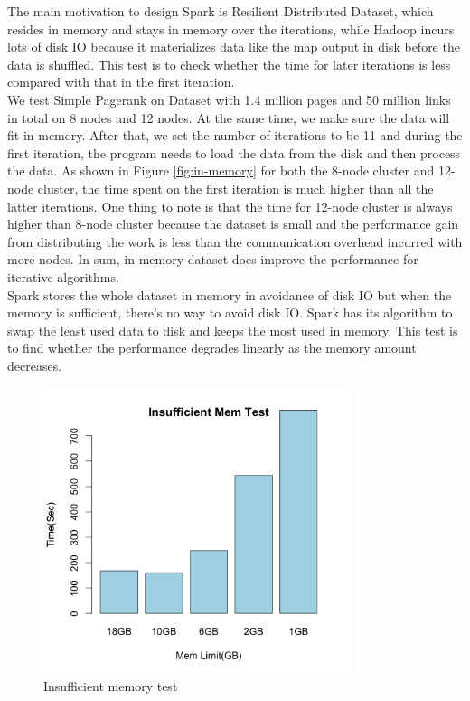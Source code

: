 \documentclass{article}
\begin{document}
The main motivation to design Spark is Resilient Distributed Dataset, which resides in memory and stays in memory over the iterations, while Hadoop incurs lots of disk IO because it materializes data like the map output in disk before the data is shuffled. This test is to check whether the time for later iterations is less compared with that in the first iteration.\\


We test Simple Pagerank on Dataset with 1.4 million pages and 50 million links in total on 8 nodes and 12 nodes. At the same time, we make sure the data will fit in memory. After that, we set the number of iterations to be 11 and during the first iteration, the program needs to load the data from the disk and then process the data. As shown in Figure \ref{fig:in-memory} for both the 8-node cluster and 12-node cluster, the time spent on the first iteration is much higher than all the latter iterations. One thing to note is that the time for 12-node cluster is always higher than 8-node cluster because the dataset is small and the performance gain from distributing the work is less than the communication overhead incurred with more nodes. In sum, in-memory dataset does improve the performance for iterative algorithms.\\

Spark stores the whole dataset in memory in avoidance of disk IO but when the memory is sufficient, there’s no way to avoid disk IO. Spark has its algorithm to swap the least used data to disk and keeps the most used in memory. This test is to find whether the performance degrades linearly as the memory amount decreases.\\


\begin{figure}[H]
        \centering
        \includegraphics[width=90mm]{images/insufficient_memory.png}
        \caption{Insufficient memory test}
        \label{fig:insuff-mem}
    \end{figure}
\end{document}
